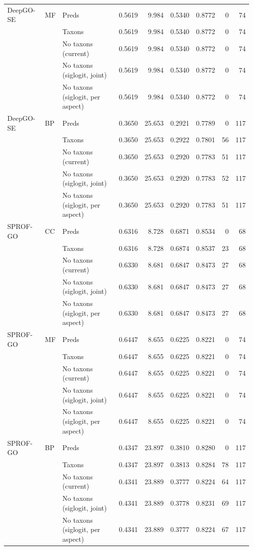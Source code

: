 \begin{tabular}{lllrrrrrr}
\addlinespace
DeepGO-SE & MF & Preds & 0.5619 & 9.984 & 0.5340 & 0.8772 & 0 & 74 \\
 &  & Taxons & 0.5619 & 9.984 & 0.5340 & 0.8772 & 0 & 74 \\
 &  & No taxons (current) & 0.5619 & 9.984 & 0.5340 & 0.8772 & 0 & 74 \\
 &  & No taxons (siglogit, joint) & 0.5619 & 9.984 & 0.5340 & 0.8772 & 0 & 74 \\
 &  & No taxons (siglogit, per aspect) & 0.5619 & 9.984 & 0.5340 & 0.8772 & 0 & 74 \\
\addlinespace
DeepGO-SE & BP & Preds & 0.3650 & 25.653 & 0.2921 & 0.7789 & 0 & 117 \\
 &  & Taxons & 0.3650 & 25.653 & 0.2922 & 0.7801 & 56 & 117 \\
 &  & No taxons (current) & 0.3650 & 25.653 & 0.2920 & 0.7783 & 51 & 117 \\
 &  & No taxons (siglogit, joint) & 0.3650 & 25.653 & 0.2920 & 0.7783 & 52 & 117 \\
 &  & No taxons (siglogit, per aspect) & 0.3650 & 25.653 & 0.2920 & 0.7783 & 51 & 117 \\
\midrule
SPROF-GO & CC & Preds & 0.6316 & 8.728 & 0.6871 & 0.8534 & 0 & 68 \\
 &  & Taxons & 0.6316 & 8.728 & 0.6874 & 0.8537 & 23 & 68 \\
 &  & No taxons (current) & 0.6330 & 8.681 & 0.6847 & 0.8473 & 27 & 68 \\
 &  & No taxons (siglogit, joint) & 0.6330 & 8.681 & 0.6847 & 0.8473 & 27 & 68 \\
 &  & No taxons (siglogit, per aspect) & 0.6330 & 8.681 & 0.6847 & 0.8473 & 27 & 68 \\
\addlinespace
SPROF-GO & MF & Preds & 0.6447 & 8.655 & 0.6225 & 0.8221 & 0 & 74 \\
 &  & Taxons & 0.6447 & 8.655 & 0.6225 & 0.8221 & 0 & 74 \\
 &  & No taxons (current) & 0.6447 & 8.655 & 0.6225 & 0.8221 & 0 & 74 \\
 &  & No taxons (siglogit, joint) & 0.6447 & 8.655 & 0.6225 & 0.8221 & 0 & 74 \\
 &  & No taxons (siglogit, per aspect) & 0.6447 & 8.655 & 0.6225 & 0.8221 & 0 & 74 \\
\addlinespace
SPROF-GO & BP & Preds & 0.4347 & 23.897 & 0.3810 & 0.8280 & 0 & 117 \\
 &  & Taxons & 0.4347 & 23.897 & 0.3813 & 0.8284 & 78 & 117 \\
 &  & No taxons (current) & 0.4341 & 23.889 & 0.3777 & 0.8224 & 64 & 117 \\
 &  & No taxons (siglogit, joint) & 0.4341 & 23.889 & 0.3778 & 0.8231 & 69 & 117 \\
 &  & No taxons (siglogit, per aspect) & 0.4341 & 23.889 & 0.3777 & 0.8224 & 67 & 117 \\
\bottomrule
\end{tabular}
